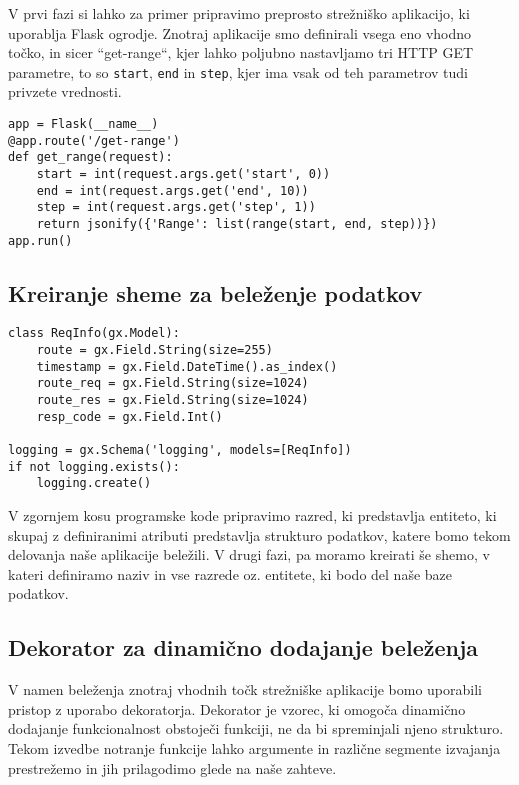 \documentclass[a4paper,12pt,openright]{book}
\begin{document}
    V prvi fazi si lahko za primer pripravimo preprosto strežniško aplikacijo, ki uporablja Flask \cite{FLASK_GITHUB} ogrodje. Znotraj aplikacije smo definirali vsega eno vhodno točko, in sicer ``get-range``, kjer lahko poljubno nastavljamo tri HTTP GET parametre, to so {\tt start}, {\tt end} in {\tt step}, kjer ima vsak od teh parametrov tudi privzete vrednosti.
    
\begin{verbatim}
app = Flask(__name__)
@app.route('/get-range')
def get_range(request):
    start = int(request.args.get('start', 0))
    end = int(request.args.get('end', 10))
    step = int(request.args.get('step', 1))
    return jsonify({'Range': list(range(start, end, step))})
app.run()
\end{verbatim}

    \subsection{Kreiranje sheme za beleženje podatkov}
\begin{verbatim}
class ReqInfo(gx.Model):
    route = gx.Field.String(size=255)
    timestamp = gx.Field.DateTime().as_index()
    route_req = gx.Field.String(size=1024)
    route_res = gx.Field.String(size=1024)
    resp_code = gx.Field.Int()

logging = gx.Schema('logging', models=[ReqInfo])
if not logging.exists():
    logging.create()
\end{verbatim}

    \noindent
    V zgornjem kosu programske kode pripravimo razred, ki predstavlja entiteto, ki skupaj z definiranimi atributi predstavlja strukturo podatkov, katere bomo tekom delovanja naše aplikacije beležili. V drugi fazi, pa moramo kreirati še shemo, v kateri definiramo naziv in vse razrede oz. entitete, ki bodo del naše baze podatkov.

    \subsection{Dekorator za dinamično dodajanje beleženja}

    V namen beleženja znotraj vhodnih točk strežniške aplikacije bomo uporabili pristop z uporabo dekoratorja.
    Dekorator je vzorec,  ki omogoča dinamično dodajanje funkcionalnost obstoječi funkciji, ne da bi spreminjali njeno strukturo. Tekom izvedbe notranje funkcije lahko argumente in različne segmente izvajanja prestrežemo in jih prilagodimo glede na naše zahteve.
    
\end{document}
